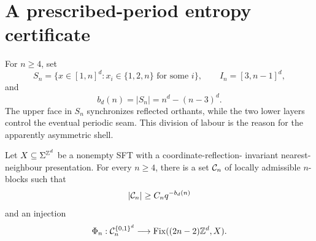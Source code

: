 \section{A prescribed-period entropy certificate}
\label{sec:reflection}

For $n\ge4$, set
\[
 S_n=\{x\in[1,n]^d:x_i\in\{1,2,n\}\text{ for some }i\},
 \qquad I_n=[3,n-1]^d,
\]
and
\begin{equation}
 b_d(n)=|S_n|=n^d-(n-3)^d.
 \label{eq:shell-size}
\end{equation}
The upper face in $S_n$ synchronizes reflected orthants, while the two lower
layers control the eventual periodic seam.  This division of labour is the
reason for the apparently asymmetric shell.

\begin{lemma}
\label{lem:reflection-injection}
Let $X\subseteq\Sigma^{\mathbb Z^d}$ be a nonempty SFT with a coordinate-reflection-
invariant nearest-neighbour presentation.  For every $n\ge4$, there is a set $\mathcal C_n$ of locally
admissible $n$-blocks such that
\[
 |\mathcal C_n|\ge C_nq^{-b_d(n)}
\]
and an injection
\[
 \Phi_n:\mathcal C_n^{\{0,1\}^d}
 \longrightarrow \operatorname{Fix}((2n-2)\mathbb Z^d,X).
\]
\end{lemma}

